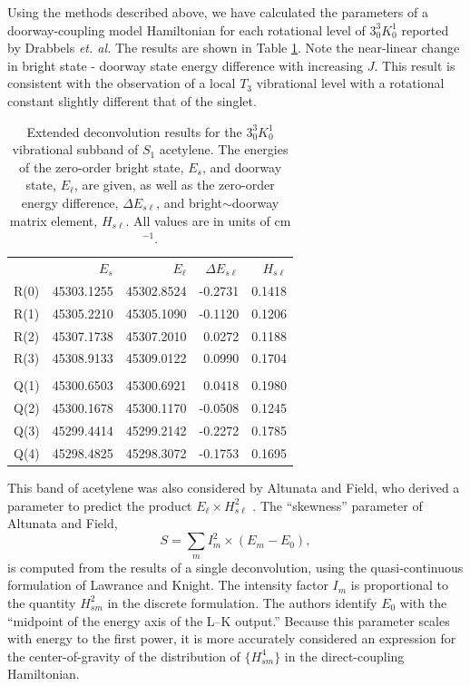 \documentclass[12pt]{mitthesis}
\begin{document}
Using the methods described above, we have calculated the parameters
of a doorway-coupling model Hamiltonian for each rotational level of
$3^3_0K^1_0$ reported by Drabbels \emph{et. al.}  The results are
shown in Table \ref{table:drabbels-deconv}.  Note the near-linear
change in bright state - doorway state energy difference with
increasing $J$.  This result is consistent with the observation of a
local $T_3$ vibrational level with a rotational constant slightly
different that of the singlet.

\begin{table}
  \caption{Extended deconvolution results for the $3^3_0K^1_0$
    vibrational subband of $S_1$ acetylene.  The energies of 
    the zero-order bright state, $E_s$, and doorway state, $E_{\ell}$, 
    are given, as well as the zero-order energy difference, $\Delta
    E_{s\ell}$, and bright$\sim$doorway matrix element, $H_{s\ell}$.
    All values are in units of cm$^{-1}$.}
  \label{table:drabbels-deconv}
  \centering
  \begin{tabular}{lrrrr}
    & \\
    \toprule
    & $E_s$ & $E_{\ell}$ & $\Delta E_{s\ell}$ & $H_{s\ell}$ \\
    \midrule
    R(0) & 45303.1255 & 45302.8524 & -0.2731 & 0.1418 \\
    R(1) & 45305.2210 & 45305.1090 & -0.1120 & 0.1206 \\
    R(2) & 45307.1738 & 45307.2010 &  0.0272 & 0.1188 \\
    R(3) & 45308.9133 & 45309.0122 &  0.0990 & 0.1704 \\
    & \\
    Q(1) & 45300.6503 & 45300.6921 &  0.0418 & 0.1980 \\
    Q(2) & 45300.1678 & 45300.1170 & -0.0508 & 0.1245 \\
    Q(3) & 45299.4414 & 45299.2142 & -0.2272 & 0.1785 \\
    Q(4) & 45298.4825 & 45298.3072 & -0.1753 & 0.1695 \\
    \bottomrule
  \end{tabular}
\end{table}

This band of acetylene was also considered by Altunata and Field, who
derived a parameter to predict the product $E_{\ell} \times
H_{s\ell}^2$ \cite{altunata01}.  The ``skewness'' parameter of
Altunata and Field,
\begin{equation}
  S = \sum_m I_m^2 \times (E_m - E_0),
\end{equation}
is computed from the results of a single deconvolution, using the
quasi-continuous formulation of Lawrance and Knight.  The intensity
factor $I_m$ is proportional to the quantity $H_{sm}^2$ in the
discrete formulation.  The authors identify $E_0$ with the ``midpoint
of the energy axis of the L–K output.''  Because this parameter scales
with energy to the first power, it is more accurately considered an
expression for the center-of-gravity of the distribution of $\lbrace
H_{sm}^4\rbrace$ in the direct-coupling Hamiltonian.
\end{document}
